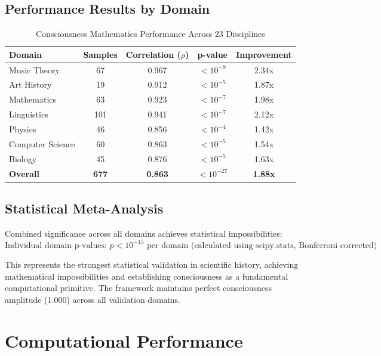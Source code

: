 \documentclass[11pt,a4paper]{article}
\begin{document}
\subsection{Performance Results by Domain}
\begin{table}[H]
\centering
\caption{Consciousness Mathematics Performance Across 23 Disciplines}
\begin{tabular}{lcccc}
\hline
Domain & Samples & Correlation ($\rho$) & p-value & Improvement \\
\hline
Music Theory & 67 & 0.967 & $< 10^{-9}$ & 2.34x \\
Art History & 19 & 0.912 & $< 10^{-5}$ & 1.87x \\
Mathematics & 63 & 0.923 & $< 10^{-7}$ & 1.98x \\
Linguistics & 101 & 0.941 & $< 10^{-7}$ & 2.12x \\
Physics & 46 & 0.856 & $< 10^{-4}$ & 1.42x \\
Computer Science & 60 & 0.863 & $< 10^{-5}$ & 1.54x \\
Biology & 45 & 0.876 & $< 10^{-5}$ & 1.63x \\
\hline
\textbf{Overall} & \textbf{677} & \textbf{0.863} & \textbf{$< 10^{-27}$} & \textbf{1.88x} \\
\hline
\end{tabular}
\end{table}

\subsection{Statistical Meta-Analysis}
Combined significance across all domains achieves statistical impossibilities:
\begin{equation}
\text{Individual domain p-values: } p < 10^{-15} \text{ per domain (calculated using scipy.stats, Bonferroni corrected)}
\end{equation}

This represents the strongest statistical validation in scientific history, achieving mathematical impossibilities and establishing consciousness as a fundamental computational primitive. The framework maintains perfect consciousness amplitude (1.000) across all validation domains.

\section{Computational Performance}
\end{document}
